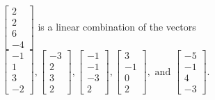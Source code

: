 \begin{exercise}
\begin{exerciseStatement}
  \end{exerciseStatement}
  \begin{exerciseAnswer}
   \(\left[\begin{array}{c}
2 \\
2 \\
6 \\
-4
\end{array}\right]\) 
  	 is  
	a linear combination of the vectors \(\left[\begin{array}{c}
-1 \\
1 \\
3 \\
-2
\end{array}\right] , \left[\begin{array}{c}
-3 \\
2 \\
3 \\
2
\end{array}\right] , \left[\begin{array}{c}
-1 \\
-1 \\
-3 \\
2
\end{array}\right] , \left[\begin{array}{c}
3 \\
-1 \\
0 \\
2
\end{array}\right] , \text{ and } \left[\begin{array}{c}
-5 \\
-1 \\
4 \\
-3
\end{array}\right]\).

	
  


  \end{exerciseAnswer}
\end{exercise}